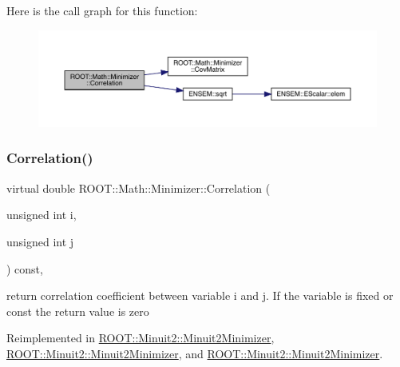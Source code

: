 Here is the call graph for this function\+:
\nopagebreak
\begin{figure}[H]
\begin{center}
\leavevmode
\includegraphics[width=350pt]{dc/dc4/classROOT_1_1Math_1_1Minimizer_a9ba2f4bc3c8c0e905f2c018e79809c0e_cgraph}
\end{center}
\end{figure}
\mbox{\label{classROOT_1_1Math_1_1Minimizer_a9ba2f4bc3c8c0e905f2c018e79809c0e}} 
\subsubsection{\texorpdfstring{Correlation()}{Correlation()}\hspace{0.1cm}{\footnotesize\ttfamily [3/3]}}
{\footnotesize\ttfamily virtual double R\+O\+O\+T\+::\+Math\+::\+Minimizer\+::\+Correlation (\begin{DoxyParamCaption}\item[{unsigned int}]{i,  }\item[{unsigned int}]{j }\end{DoxyParamCaption}) const\hspace{0.3cm}{\ttfamily [inline]}, {\ttfamily [virtual]}}

return correlation coefficient between variable i and j. If the variable is fixed or const the return value is zero 

Reimplemented in \mbox{\hyperlink{classROOT_1_1Minuit2_1_1Minuit2Minimizer_a229e82025189e72b5a03cb4e3be19f4a}{R\+O\+O\+T\+::\+Minuit2\+::\+Minuit2\+Minimizer}}, \mbox{\hyperlink{classROOT_1_1Minuit2_1_1Minuit2Minimizer_a229e82025189e72b5a03cb4e3be19f4a}{R\+O\+O\+T\+::\+Minuit2\+::\+Minuit2\+Minimizer}}, and \mbox{\hyperlink{classROOT_1_1Minuit2_1_1Minuit2Minimizer_a229e82025189e72b5a03cb4e3be19f4a}{R\+O\+O\+T\+::\+Minuit2\+::\+Minuit2\+Minimizer}}.

